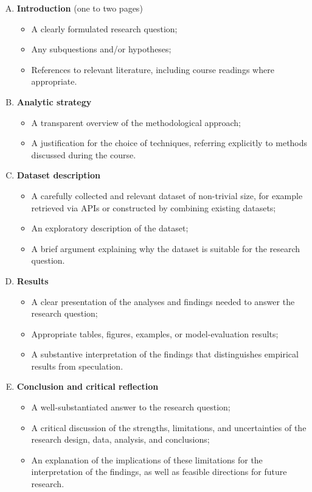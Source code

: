 \begin{enumerate}[A.]
    \item \textbf{Introduction} (one to two pages)
    \begin{itemize}
        \item A clearly formulated research question;
        \item Any subquestions and/or hypotheses;
        \item References to relevant literature, including course readings where appropriate.
    \end{itemize}

    \item \textbf{Analytic strategy}
    \begin{itemize}
        \item A transparent overview of the methodological approach;
        \item A justification for the choice of techniques, referring explicitly to methods discussed during the course.
    \end{itemize}

    \item \textbf{Dataset description}
    \begin{itemize}
        \item A carefully collected and relevant dataset of non-trivial size, for example retrieved via APIs or constructed by combining existing datasets;
        \item An exploratory description of the dataset;
        \item A brief argument explaining why the dataset is suitable for the research question.
    \end{itemize}

    \item \textbf{Results}
    \begin{itemize}
        \item A clear presentation of the analyses and findings needed to answer the research question;
        \item Appropriate tables, figures, examples, or model-evaluation results;
        \item A substantive interpretation of the findings that distinguishes empirical results from speculation.
    \end{itemize}

    \item \textbf{Conclusion and critical reflection}
    \begin{itemize}
        \item A well-substantiated answer to the research question;
        \item A critical discussion of the strengths, limitations, and uncertainties of the research design, data, analysis, and conclusions;
        \item An explanation of the implications of these limitations for the interpretation of the findings, as well as feasible directions for future research.
    \end{itemize}
\end{enumerate}

